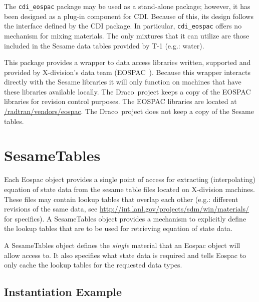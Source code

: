 \documentclass[11pt]{nmemo}
\newcommand{\draco}{{\normalfont\sffamily Draco}}
\begin{document}
The \texttt{cdi\_eospac} package may be used as a stand-alone package;
however, it has been designed as a plug-in component for CDI.  Because
of this, its design follows the interface defined by the CDI package.
In particular, \texttt{cdi\_eospac} offers no mechanism for mixing
materials.  The only mixtures that it can utilize are those included 
in the Sesame data tables provided by T-1 (e.g.: water). 

This package provides a wrapper to data access libraries written,
supported and provided by X-division's data team
(EOSPAC~\cite{eospac-cranfill,eospac-web-site}).  Because this wrapper
interacts directly with the Sesame libraries it will only function on
machines that have these libraries available locally. The \draco\ 
project keeps a copy of the EOSPAC libraries for revision control
purposes.  The EOSPAC libraries are located at
\url{/radtran/vendors/eospac}.  The \draco\ project does not keep a
copy of the Sesame tables.



\section{SesameTables}
\label{SesameTables}

Each Eospac object provides a single point of access for extracting
(interpolating) equation of state data from the sesame table files
located on X-division machines.  These files may contain lookup
tables that overlap each other (e.g.: different revisions of the same
data, see \url{http://int.lanl.gov/projects/sdm/win/materials/} for
specifics).  A SesameTables object provides a mechanism to explicitly
define the lookup tables that are to be used for retrieving equation
of state data.

A SesameTables object defines the \emph{single} material that an
Eospac object will allow access to.  It also specifies what state data
is required and tells Eospac to only cache the lookup tables for the
requested data types.


\subsection{Instantiation Example}
\end{document}

